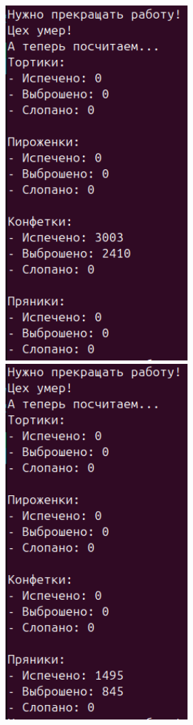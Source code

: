 \documentclass[a4paper,14pt]{extarticle}
\begin{document}
\includegraphics[width=70mm]{processes_output_3_3}
\includegraphics[width=70mm]{processes_output_3_4}
\end{document}
